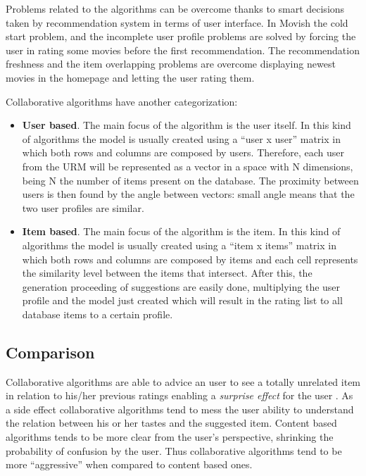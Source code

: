 Problems related to the algorithms can be overcome thanks to smart decisions taken by recommendation system in terms of user interface. In Movish the cold start problem, and the incomplete user profile problems are solved by forcing the user in rating some movies before the first recommendation. The recommendation freshness and the item overlapping problems are overcome displaying newest movies in the homepage and letting the user rating them.

Collaborative algorithms have another categorization:

\begin{itemize}
\item \textbf{User based}. The main focus of the algorithm is the user itself. In this kind of algorithms the model is usually created using a ``user x user'' matrix in which both rows and columns are composed by users. Therefore, each user from the URM will be represented as a vector in a space with N dimensions, being N the number of items present on the database.
The proximity between users is then found by the angle between vectors: small angle means that the two user profiles are similar.
\item \textbf{Item based}. The main focus of the algorithm is the item. In this kind of algorithms the model is usually created using a ``item x items'' matrix in which both rows and columns are composed by items and each cell represents the similarity level between the items that intersect. After this, the generation proceeding of suggestions are easily done, multiplying the user profile and the model just created which will result in the rating list to all database items to a certain profile.
\end{itemize}

\subsection{Comparison}
\label{sec:Comparison}

Collaborative algorithms are able to advice an user to see a totally unrelated item in relation to his/her previous ratings enabling a \textit{surprise effect} for the user \cite{evaluating-collaborative-filtering}. As a side effect collaborative algorithms tend to mess the user ability to understand the relation between his or her tastes and the suggested item. Content based algorithms tends to be more clear from the user's perspective, shrinking the probability of confusion by the user. Thus collaborative algorithms tend to be more ``aggressive'' when compared to content based ones.

